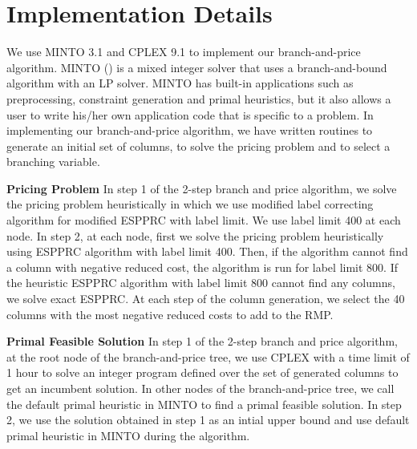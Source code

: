 \section{Implementation Details}

We use MINTO 3.1 and CPLEX 9.1 to implement our branch-and-price
algorithm. MINTO (\citet{Savelsbergh2}) is a mixed integer solver 
that uses a branch-and-bound algorithm with an LP solver. 
MINTO has built-in applications such as preprocessing, constraint 
generation and primal heuristics, but it also allows a user to write 
his/her own application code that is specific to a problem. In 
implementing our branch-and-price algorithm, we have written routines 
to generate an initial set of columns, to solve the pricing problem 
and to select a branching variable. 

{\bf Pricing Problem} In step 1 of the 2-step branch and price  algorithm, we solve the 
pricing problem heuristically in which we use modified label correcting
algorithm for modified ESPPRC with label limit. We use label limit 400
at each node. 
In step 2, at each node, first we solve the pricing problem 
heuristically using ESPPRC algorithm with label limit 400. Then, if
the algorithm cannot find a column with negative reduced cost, the 
algorithm is run for label limit 800. If the heuristic ESPPRC algorithm
with label limit 800 cannot find any columns, we solve exact ESPPRC.
At each step of the column generation, we select the  
40 columns with the most negative reduced costs to add to the RMP. 

{\bf Primal Feasible Solution} In step 1 of the 2-step branch and price algorithm,
at the root node of the branch-and-price tree, we use CPLEX with a time limit of
1 hour to solve an integer program defined over the set of generated columns  
to get an incumbent solution.  
In other nodes of the branch-and-price tree, we call the default primal heuristic 
in MINTO to find a primal feasible solution. In step 2, we use the solution
obtained in step 1 as an intial upper bound and use  default primal heuristic 
in MINTO during the algorithm.

